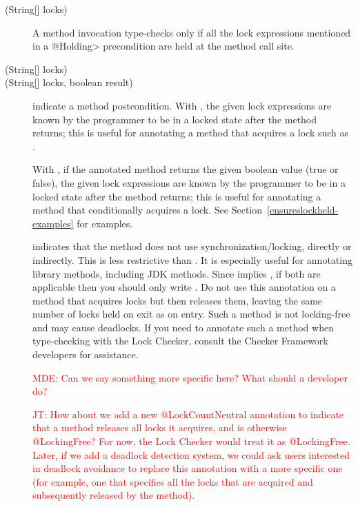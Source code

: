 \begin{description}
\item[\small{(String[] locks)}]
  A method invocation type-checks only if all the lock expressions
  mentioned in a \<@Holding> precondition are held at the method call site.
\item[\small{(String[] locks)}]
\item[\small{(String[] locks, boolean result)}]
  indicate a method postcondition.  With , the given lock
  expressions are known by the programmer to be in
  a locked state after the method returns; this is useful for annotating a
  method that acquires a lock such as
  .

  With , if the annotated method returns the given
  boolean value (true or false), the given lock
  expressions are known by the programmer to be in
  a locked state after the method returns; this is useful for annotating a
  method that conditionally acquires a lock.
  See Section~\ref{ensureslockheld-examples} for examples.

\item[]
  indicates that the method does not use synchronization/locking,
  directly or indirectly.  This is less restrictive than
  . It is especially useful for
  annotating library methods, including JDK methods. Since
   implies , if both are applicable
  then you should only write .
  Do not use this annotation on a method that acquires locks but then releases
  them, leaving the same number of locks held on exit as on entry.  Such a
  method is not locking-free and may cause deadlocks.  If you need to annotate
  such a method when type-checking with the Lock Checker, consult the
  Checker Framework developers for assistance.

\textcolor{red}{MDE: Can we say something more specific here? What should a developer do?}

\textcolor{red}{JT: How about we add a new @LockCountNeutral annotation
to indicate that a method releases all locks it acquires, and is otherwise @LockingFree?
For now, the Lock Checker would treat it as @LockingFree.  Later, if we add a deadlock
detection system, we could ask users interested
in deadlock avoidance to replace this annotation with a more specific one (for example, one
that specifies all the locks that are acquired and subsequently released by the method).}

\end{description}


